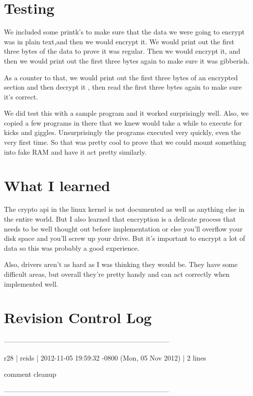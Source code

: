 \documentclass[letterpaper,10pt]{article}
\begin{document}
\section{Testing}
We included some printk's to make sure that the data we were going to encrypt was in plain text,and then we would encrypt it. We would print out the first three bytes of the data to prove it was regular. Then we would encrypt it, and then we would print out the first three bytes again to make sure it was gibberish. 

As a counter to that, we would print out the first three bytes of an encrypted section and then decrypt it , then read the first three bytes again to make sure it's correct. 

We did test this with a sample program and it worked surprisingly well. Also, we copied a few programs in there that we knew would take a while to execute for kicks and giggles. Unsurprisingly the programs executed very quickly, even the very first time. So that was pretty cool to prove that we could mount something into fake RAM and have it act pretty similarly. 

\section{What I learned}
The crypto api in the linux kernel is not documented as well as anything else in the entire world. But I also learned that encryption is a delicate process that needs to be well thought out before implementation or else you'll overflow your disk space and you'll screw up your drive. But it's important to encrypt a lot of data so this was probably a good experience. 

Also, drivers aren't as hard as I was thinking they would be. They have some difficult areas, but overall they're pretty handy and can act correctly when implemented well. 

\section{Revision Control Log}

------------------------------------------------------------------------


r28 | reids | 2012-11-05 19:59:32 -0800 (Mon, 05 Nov 2012) | 2 lines


comment cleanup


------------------------------------------------------------------------
\end{document}
